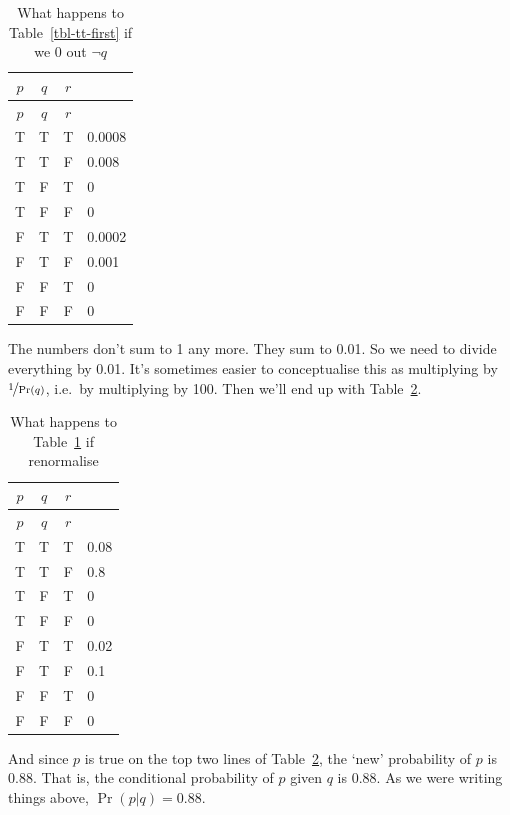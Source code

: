 \documentclass[
  11pt,
  letterpaper,
]{scrbook}
\begin{document}
\begin{longtable}[]{@{}cccl@{}}
\caption{What happens to Table~\ref{tbl-tt-first} if we 0 out
\(\neg q\)}\label{tbl-tt-second}\tabularnewline
\toprule\noalign{}
\(p\) & \(q\) & \(r\) & \\
\midrule\noalign{}
\endfirsthead
\toprule\noalign{}
\(p\) & \(q\) & \(r\) & \\
\midrule\noalign{}
\endhead
\bottomrule\noalign{}
\endlastfoot
T & T & T & 0.0008 \\
T & T & F & 0.008 \\
T & F & T & 0 \\
T & F & F & 0 \\
F & T & T & 0.0002 \\
F & T & F & 0.001 \\
F & F & T & 0 \\
F & F & F & 0 \\
\end{longtable}

The numbers don't sum to 1 any more. They sum to 0.01. So we need to
divide everything by 0.01. It's sometimes easier to conceptualise this
as multiplying by \(\nicefrac{1}{\Pr(q)}\), i.e.~by multiplying by 100.
Then we'll end up with Table~\ref{tbl-tt-third}.

\begin{longtable}[]{@{}cccl@{}}
\caption{What happens to Table~\ref{tbl-tt-second} if
renormalise}\label{tbl-tt-third}\tabularnewline
\toprule\noalign{}
\(p\) & \(q\) & \(r\) & \\
\midrule\noalign{}
\endfirsthead
\toprule\noalign{}
\(p\) & \(q\) & \(r\) & \\
\midrule\noalign{}
\endhead
\bottomrule\noalign{}
\endlastfoot
T & T & T & 0.08 \\
T & T & F & 0.8 \\
T & F & T & 0 \\
T & F & F & 0 \\
F & T & T & 0.02 \\
F & T & F & 0.1 \\
F & F & T & 0 \\
F & F & F & 0 \\
\end{longtable}

And since \(p\) is true on the top two lines of
Table~\ref{tbl-tt-third}, the `new' probability of \(p\) is 0.88. That
is, the conditional probability of \(p\) given \(q\) is 0.88. As we were
writing things above, \(\Pr(p | q) = 0.88\).
\end{document}
